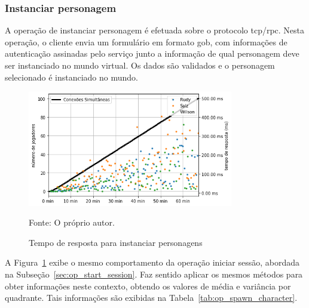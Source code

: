 \subsubsection{Instanciar personagem}

A operação de instanciar personagem é efetuada sobre o protocolo \ac{tcp}/\ac{rpc}.
%
Nesta operação, o cliente envia um formulário em formato \ac{gob}, com informações de autenticação assinadas pelo serviço junto a informação de qual personagem deve ser instanciado no mundo virtual.
%
Os dados são validados e o personagem selecionado é instanciado no mundo.

\begin{figure}[htb!]
  \caption{Tempo de resposta para instanciar personagens}
  \label{fig:spawn_character_request_time}
  \includegraphics[width=0.8\textwidth]{figuras/analise/rt/spawn_character_request_time.png}
  \centering

  Fonte: O próprio autor.
\end{figure}

A Figura~\ref{fig:spawn_character_request_time} exibe o mesmo comportamento da operação iniciar sessão, abordada na Subseção~\ref{sec:op_start_session}.
%
Faz sentido aplicar os mesmos métodos para obter informações neste contexto, obtendo os valores de média e variância por quadrante.
%
Tais informações são exibidas na Tabela~\ref{tab:op_spawn_character}.

